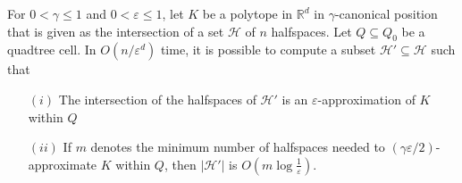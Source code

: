\documentclass[11pt]{article}   \usepackage[letterpaper,hmargin=2.1cm,vmargin=3cm]{geometry}
\newcommand{\RE}{\mathbb{R}}    \newcommand{\ZZ}{\mathbb{Z}}    \newcommand{\eps}{\varepsilon}  \newcommand{\ST}{\,:\,}         \newcommand{\sq}{\square}
\newcommand{\inv}[1]{\frac{1}{#1}}
\begin{document}
\begin{lemma} \label{lem:apx-cover}
For $0 < \gamma \le 1$ and $0 < \eps \le 1$, let $K$ be a polytope in $\RE^d$ in $\gamma$-canonical position that is given as the intersection of a set $\mathcal{H}$ of $n$ halfspaces. Let $Q \subseteq Q_0$ be a quadtree cell. In $O(n/\eps^d)$ time, it is possible to compute a subset $\mathcal{H'} \subseteq \mathcal{H}$ such that  
\begin{enumerate}
\setlength{\itemsep}{-0.5ex}\setlength{\parsep}{0pt}\item[$(i)$] The intersection of the halfspaces of $\mathcal{H'}$ is an $\eps$-approximation of $K$ within $Q$

\item[$(ii)$] If $m$ denotes the minimum number of halfspaces needed to $(\gamma \eps/2)$-approximate $K$ within $Q$, then $|\mathcal{H'}|$ is $O(m \log \inv{\eps})$.
\end{enumerate}
\end{lemma}
\end{document}
